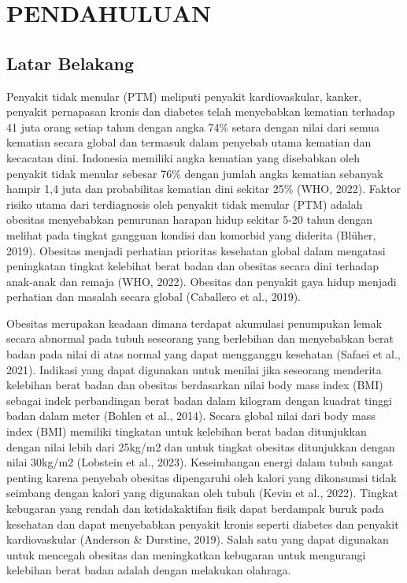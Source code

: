\chapter{PENDAHULUAN}
\label{chap:pendahuluan}


\section{Latar Belakang}
\label{sec:latarbelakang}

Penyakit tidak menular (PTM) meliputi penyakit kardiovaskular, kanker, penyakit pernapasan kronis dan diabetes telah menyebabkan kematian terhadap 41 juta orang setiap tahun dengan angka 74\% setara dengan nilai dari semua kematian secara global dan termasuk dalam penyebab utama kematian dan kecacatan dini. Indonesia memiliki angka kematian yang disebabkan oleh penyakit tidak menular sebesar 76\% dengan jumlah angka kematian sebanyak hampir 1,4 juta dan probabilitas kematian dini sekitar 25\% \parencite{who1} (WHO, 2022). Faktor risiko utama dari terdiagnosis oleh penyakit tidak menular (PTM) adalah obesitas menyebabkan penurunan harapan hidup sekitar 5-20 tahun dengan melihat pada tingkat gangguan kondisi dan komorbid yang diderita (Blüher, 2019). Obesitas menjadi perhatian prioritas kesehatan global dalam mengatasi peningkatan tingkat kelebihat berat badan dan obesitas secara dini terhadap anak-anak dan remaja (WHO, 2022). Obesitas dan penyakit gaya hidup menjadi perhatian dan masalah secara global (Caballero et al., 2019).

Obesitas merupakan keadaan dimana terdapat akumulasi penumpukan lemak secara abnormal pada tubuh seseorang yang berlebihan dan menyebabkan berat badan pada nilai di atas normal yang dapat mengganggu kesehatan (Safaei et al., 2021). Indikasi yang dapat digunakan untuk menilai jika seseorang menderita kelebihan berat badan dan obesitas berdasarkan nilai body mass index (BMI) sebagai indek perbandingan berat badan dalam kilogram dengan kuadrat tinggi badan dalam meter (Bohlen et al., 2014). Secara global nilai dari body mass index (BMI) memiliki tingkatan untuk kelebihan berat badan ditunjukkan dengan nilai lebih dari 25kg/m2 dan untuk tingkat obesitas ditunjukkan dengan nilai 30kg/m2 (Lobstein et al., 2023). Keseimbangan energi dalam tubuh sangat penting karena penyebab obesitas dipengaruhi oleh kalori yang dikonsumsi tidak seimbang dengan kalori yang digunakan oleh tubuh (Kevin et al., 2022). Tingkat kebugaran yang rendah dan ketidakaktifan fisik dapat berdampak buruk pada kesehatan dan dapat menyebabkan penyakit kronis seperti diabetes dan penyakit kardiovaskular (Anderson \& Durstine, 2019). Salah satu yang dapat digunakan untuk mencegah obesitas dan meningkatkan kebugaran untuk mengurangi kelebihan berat badan adalah dengan melakukan olahraga.

